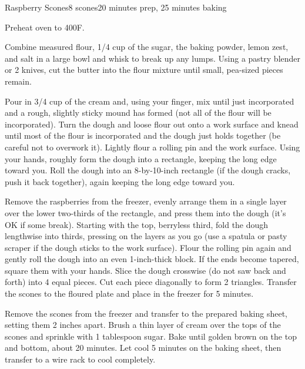 \documentclass[../Cookbook.tex]{subfiles}
\begin{document}
\begin{recipe}{Raspberry Scones}{8 scones}{20 minutes prep, 25 minutes baking}

	Preheat oven to 400\0F.


Combine measured flour, 1/4 cup of the sugar, the baking powder, lemon zest, and salt in a large bowl and whisk to break up any lumps. Using a pastry blender or 2 knives, cut the butter into the flour mixture until small, pea-sized pieces remain.

Pour in 3/4 cup of the cream and, using your finger, mix until just incorporated and a rough, slightly sticky mound has formed (not all of the flour will be incorporated). Turn the dough and loose flour out onto a work surface and knead until most of the flour is incorporated and the dough just holds together (be careful not to overwork it). Lightly flour a rolling pin and the work surface. Using your hands, roughly form the dough into a rectangle, keeping the long edge toward you. Roll the dough into an 8-by-10-inch rectangle (if the dough cracks, push it back together), again keeping the long edge toward you.

Remove the raspberries from the freezer, evenly arrange them in a single layer over the lower two-thirds of the rectangle, and press them into the dough (it’s OK if some break).
Starting with the top, berryless third, fold the dough lengthwise into thirds, pressing on the layers as you go (use a spatula or pasty scraper if the dough sticks to the work surface).
Flour the rolling pin again and gently roll the dough into an even 1-inch-thick block. If the ends become tapered, square them with your hands. Slice the dough crosswise (do not saw back and forth) into 4 equal pieces. Cut each piece diagonally to form 2 triangles.
Transfer the scones to the floured plate and place in the freezer for 5 minutes.

\newstep
Remove the scones from the freezer and transfer to the prepared baking sheet, setting them 2 inches apart. Brush a thin layer of cream over the tops of the scones and sprinkle with 1 tablespoon sugar. Bake until golden brown on the top and bottom, about 20 minutes. Let cool 5 minutes on the baking sheet, then transfer to a wire rack to cool completely.

\end{recipe}
\end{document}
